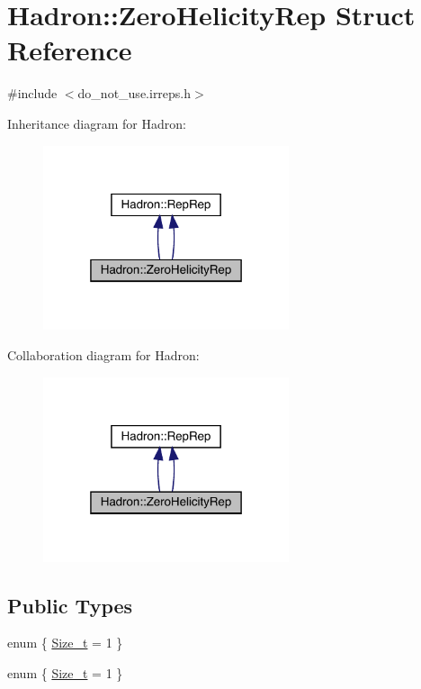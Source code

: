 \hypertarget{structHadron_1_1ZeroHelicityRep}{}\section{Hadron\+:\+:Zero\+Helicity\+Rep Struct Reference}
\label{structHadron_1_1ZeroHelicityRep}


{\ttfamily \#include $<$do\+\_\+not\+\_\+use.\+irreps.\+h$>$}



Inheritance diagram for Hadron\+:
\nopagebreak
\begin{figure}[H]
\begin{center}
\leavevmode
\includegraphics[width=205pt]{dc/d43/structHadron_1_1ZeroHelicityRep__inherit__graph}
\end{center}
\end{figure}


Collaboration diagram for Hadron\+:
\nopagebreak
\begin{figure}[H]
\begin{center}
\leavevmode
\includegraphics[width=205pt]{d1/de7/structHadron_1_1ZeroHelicityRep__coll__graph}
\end{center}
\end{figure}
\subsection*{Public Types}
\begin{DoxyCompactItemize}
\item 
enum \{ \mbox{\hyperlink{structHadron_1_1ZeroHelicityRep_aa7294c546ade93e6aa4f1bbc2bf66a32a646a375ab5183b33023e33d69156fa52}{Size\+\_\+t}} = 1
 \}
\item 
enum \{ \mbox{\hyperlink{structHadron_1_1ZeroHelicityRep_aa7294c546ade93e6aa4f1bbc2bf66a32a646a375ab5183b33023e33d69156fa52}{Size\+\_\+t}} = 1
 \}
\end{DoxyCompactItemize}
